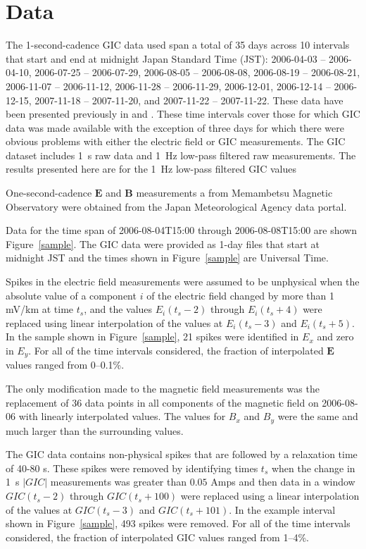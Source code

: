\documentclass[draft,linenumbers]{agujournal2018}
\begin{document}
\section{Data}

The 1-second-cadence GIC data used span a total of 35 days across 10 intervals that start and end at midnight Japan Standard Time (JST): 2006-04-03 -- 2006-04-10, 2006-07-25 -- 2006-07-29, 2006-08-05 -- 2006-08-08, 2006-08-19 -- 2006-08-21, 2006-11-07 -- 2006-11-12, 2006-11-28 -- 2006-11-29, 2006-12-01, 2006-12-14 -- 2006-12-15, 2007-11-18 -- 2007-11-20, and 2007-11-22 -- 2007-11-22. These data have been presented previously in \citet{Watari2009} and \cite{Watari2015}. These time intervals cover those for which GIC data was made available with the exception of three days for which there were obvious problems with either the electric field or GIC measurements. The GIC dataset includes 1~s raw data and 1~Hz low-pass filtered raw measurements. The results presented here are for the 1~Hz low-pass filtered GIC values

One-second-cadence $\mathbf{E}$ and $\mathbf{B}$ measurements a from Memambetsu Magnetic Observatory were obtained from the Japan Meteorological Agency data portal.

Data for the time span of 2006-08-04T15:00 through 2006-08-08T15:00 are shown Figure~\ref{sample}. The GIC data were provided as 1-day files that start at midnight JST and the times shown in Figure~\ref{sample} are Universal Time.

Spikes in the electric field measurements were assumed to be unphysical when the absolute value of a component $i$ of the electric field changed by more than 1 mV/km at time $t_s$, and the values $E_i(t_s-2)$ through $E_i(t_s+4)$ were replaced using linear interpolation of the values at $E_i(t_s-3)$ and $E_i(t_s + 5)$. In the sample shown in Figure~\ref{sample}, 21 spikes were identified in $E_x$ and zero in $E_y$. For all of the time intervals considered, the fraction of interpolated $\mathbf{E}$ values ranged from 0--0.1\%.

The only modification made to the magnetic field measurements was the replacement of 36 data points in all components of the magnetic field on 2006-08-06 with linearly interpolated values. The values for $B_x$ and $B_y$ were the same and much larger than the surrounding values.

The GIC data contains non-physical spikes that are followed by a relaxation time of 40-80 s. These spikes were removed by identifying times $t_s$ when the change in 1~s $|GIC|$ measurements was greater than $0.05$ Amps and then data in a window $GIC(t_s-2)$ through $GIC(t_s+100)$ were replaced using a linear interpolation of the values at $GIC(t_s-3)$ and $GIC(t_s + 101)$. In the example interval shown in Figure~\ref{sample}, 493 spikes were removed. For all of the time intervals considered, the fraction of interpolated GIC values ranged from 1--4\%.
\end{document}

